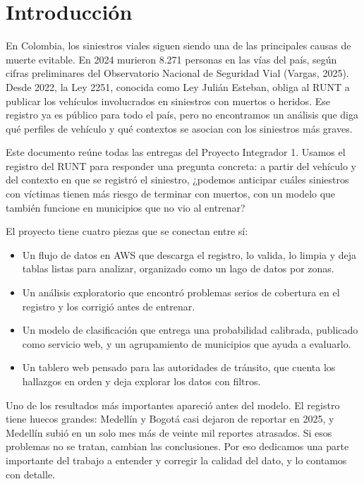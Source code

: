 \documentclass[11pt,a4paper]{article}
\begin{document}
\setcounter{tocdepth}{2}
\tableofcontents
\newpage

\section{Introducción}

En Colombia, los siniestros viales siguen siendo una de las principales causas de muerte evitable. En 2024 murieron 8.271 personas en las vías del país, según cifras preliminares del Observatorio Nacional de Seguridad Vial (Vargas, 2025). Desde 2022, la Ley 2251, conocida como Ley Julián Esteban, obliga al RUNT a publicar los vehículos involucrados en siniestros con muertos o heridos. Ese registro ya es público para todo el país, pero no encontramos un análisis que diga qué perfiles de vehículo y qué contextos se asocian con los siniestros más graves.

Este documento reúne todas las entregas del Proyecto Integrador 1. Usamos el registro del RUNT para responder una pregunta concreta: a partir del vehículo y del contexto en que se registró el siniestro, ¿podemos anticipar cuáles siniestros con víctimas tienen más riesgo de terminar con muertos, con un modelo que también funcione en municipios que no vio al entrenar?

El proyecto tiene cuatro piezas que se conectan entre sí:

\begin{itemize}
  \item Un flujo de datos en AWS que descarga el registro, lo valida, lo limpia y deja tablas listas para analizar, organizado como un lago de datos por zonas.
  \item Un análisis exploratorio que encontró problemas serios de cobertura en el registro y los corrigió antes de entrenar.
  \item Un modelo de clasificación que entrega una probabilidad calibrada, publicado como servicio web, y un agrupamiento de municipios que ayuda a evaluarlo.
  \item Un tablero web pensado para las autoridades de tránsito, que cuenta los hallazgos en orden y deja explorar los datos con filtros.
\end{itemize}

Uno de los resultados más importantes apareció antes del modelo. El registro tiene huecos grandes: Medellín y Bogotá casi dejaron de reportar en 2025, y Medellín subió en un solo mes más de veinte mil reportes atrasados. Si esos problemas no se tratan, cambian las conclusiones. Por eso dedicamos una parte importante del trabajo a entender y corregir la calidad del dato, y lo contamos con detalle.
\end{document}
